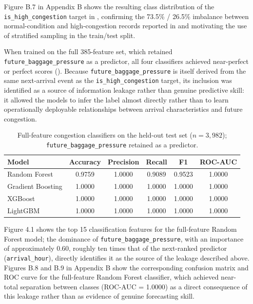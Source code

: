 Figure B.7 in Appendix B shows the resulting class distribution of the \nolinkurl{is_high_congestion} target in , confirming the 73.5\% / 26.5\% imbalance between normal-condition and high-congestion records reported in  and motivating the use of stratified sampling in the train/test split.

When trained on the full 385-feature set, which retained \nolinkurl{future_baggage_pressure} as a predictor, all four classifiers achieved near-perfect or perfect scores (). Because \nolinkurl{future_baggage_pressure} is itself derived from the same next-arrival event as the \nolinkurl{is_high_congestion} target, its inclusion was identified as a source of information leakage rather than genuine predictive skill: it allowed the models to infer the label almost directly rather than to learn operationally deployable relationships between arrival characteristics and future congestion.

\begin{table}[htbp]
  \centering
  \renewcommand{\arraystretch}{1.25}
  \caption[Full-feature congestion-classifier performance]{Full-feature congestion classifiers on the held-out test set ($n = 3{,}982$); \texttt{future\_baggage\_pressure} retained as a predictor.}
  \label{tab:full-feature-congestion-classifiers}
  \begin{tabularx}{\textwidth}{|X|c|c|c|c|c|}
    \hline
    \textbf{Model} & \textbf{Accuracy} & \textbf{Precision} & \textbf{Recall} & \textbf{F1} & \textbf{ROC-AUC} \\
    \hline
    Random Forest     & 0.9759 & 1.0000 & 0.9089 & 0.9523 & 1.0000 \\
    \hline
    Gradient Boosting & 1.0000 & 1.0000 & 1.0000 & 1.0000 & 1.0000 \\
    \hline
    XGBoost           & 1.0000 & 1.0000 & 1.0000 & 1.0000 & 1.0000 \\
    \hline
    LightGBM          & 1.0000 & 1.0000 & 1.0000 & 1.0000 & 1.0000 \\
    \hline
  \end{tabularx}
\end{table}

Figure 4.1 shows the top 15 classification features for the full-feature Random Forest model; the dominance of \nolinkurl{future_baggage_pressure}, with an importance of approximately 0.60, roughly ten times that of the next-ranked predictor (\nolinkurl{arrival_hour}), directly identifies it as the source of the leakage described above. Figures B.8 and B.9 in Appendix B show the corresponding confusion matrix and ROC curve for the full-feature Random Forest classifier, which achieved near-total separation between classes (ROC-AUC = 1.0000) as a direct consequence of this leakage rather than as evidence of genuine forecasting skill.

